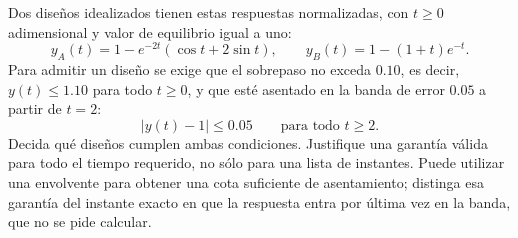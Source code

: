 Dos diseños idealizados tienen estas respuestas normalizadas, con \(t\ge0\) adimensional y valor de equilibrio igual a uno:
\[
y_A(t)=1-e^{-2t}(\cos t+2\sin t),\qquad
 y_B(t)=1-(1+t)e^{-t}.
\]
Para admitir un diseño se exige que el sobrepaso no exceda \(0.10\), es decir, \(y(t)\le1.10\) para todo \(t\ge0\), y que esté asentado en la banda de error \(0.05\) a partir de \(t=2\):
\[
|y(t)-1|\le0.05\qquad\text{para todo }t\ge2.
\]
Decida qué diseños cumplen ambas condiciones. Justifique una garantía válida para todo el tiempo requerido, no sólo para una lista de instantes. Puede utilizar una envolvente para obtener una cota suficiente de asentamiento; distinga esa garantía del instante exacto en que la respuesta entra por última vez en la banda, que no se pide calcular.
